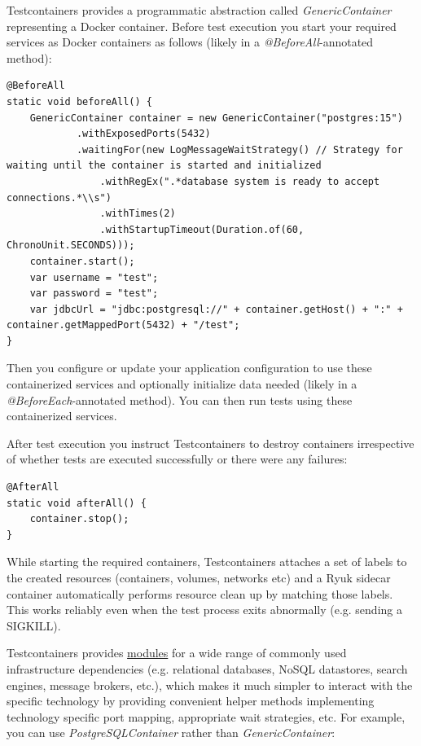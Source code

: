 \documentclass[table, xcdraw]{article}%
\begin{document}
Testcontainers provides a programmatic abstraction called \textit{GenericContainer} representing a Docker container. Before test execution you start your required services as Docker containers as follows (likely in a \textit{@BeforeAll}-annotated method):

\begin{verbatim}
@BeforeAll
static void beforeAll() {
    GenericContainer container = new GenericContainer("postgres:15")
            .withExposedPorts(5432)
            .waitingFor(new LogMessageWaitStrategy() // Strategy for waiting until the container is started and initialized
                .withRegEx(".*database system is ready to accept connections.*\\s")
                .withTimes(2)
                .withStartupTimeout(Duration.of(60, ChronoUnit.SECONDS)));
    container.start();
    var username = "test";
    var password = "test";
    var jdbcUrl = "jdbc:postgresql://" + container.getHost() + ":" + container.getMappedPort(5432) + "/test";
}
\end{verbatim}

Then you configure or update your application configuration to use these containerized services and optionally initialize data needed (likely in a \textit{@BeforeEach}-annotated method). You can then run tests using these containerized services.

After test execution you instruct Testcontainers to destroy containers irrespective of whether tests are executed successfully or there were any failures:

\begin{verbatim}
@AfterAll
static void afterAll() {
    container.stop();
}
\end{verbatim}

While starting the required containers, Testcontainers attaches a set of labels to the created resources (containers, volumes, networks etc) and a Ryuk sidecar container automatically performs resource clean up by matching those labels. This works reliably even when the test process exits abnormally (e.g. sending a SIGKILL).

Testcontainers provides \href{https://testcontainers.com/modules}{modules} for a wide range of commonly used infrastructure dependencies (e.g. relational databases, NoSQL datastores, search engines, message brokers, etc.), which makes it much simpler to interact with the specific technology by providing convenient helper methods implementing technology specific port mapping, appropriate wait strategies, etc. For example, you can use \textit{PostgreSQLContainer} rather than \textit{GenericContainer}:
\end{document}
